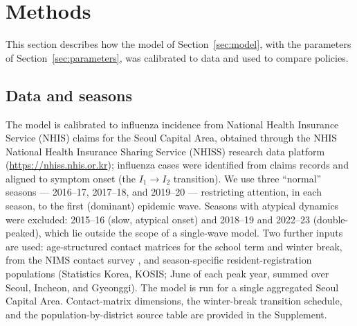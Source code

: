 \documentclass[12pt]{article}
\theoremstyle{plain}
\theoremstyle{remark}
\theoremstyle{definition}
\begin{document}
\section{Methods}
\label{sec:methods}
This section describes how the model of Section~\ref{sec:model}, with the parameters of Section~\ref{sec:parameters}, was calibrated to data and used to compare policies.

\subsection{Data and seasons}
\label{sec:data}
The model is calibrated to influenza incidence from National Health Insurance Service (NHIS) claims for the Seoul Capital Area, obtained through the NHIS National Health Insurance Sharing Service (NHISS) research data platform (\url{https://nhiss.nhis.or.kr}); influenza cases were identified from claims records and aligned to symptom onset (the $I_1\to I_2$ transition). We use three ``normal'' seasons --- 2016--17, 2017--18, and 2019--20 --- restricting attention, in each season, to the first (dominant) epidemic wave. Seasons with atypical dynamics were excluded: 2015--16 (slow, atypical onset) and 2018--19 and 2022--23 (double-peaked), which lie outside the scope of a single-wave model. Two further inputs are used: age-structured contact matrices for the school term and winter break, from the NIMS contact survey \cite{Son2025,Chae2026}, and season-specific resident-registration populations (Statistics Korea, KOSIS; June of each peak year, summed over Seoul, Incheon, and Gyeonggi). The model is run for a single aggregated Seoul Capital Area. Contact-matrix dimensions, the winter-break transition schedule, and the population-by-district source table are provided in the Supplement.
\end{document}
